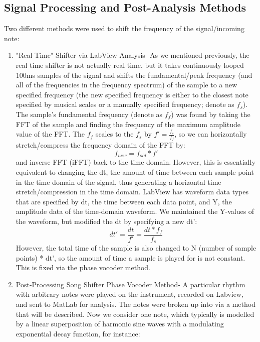 \documentclass{article}
\begin{document}
    \subsection{Signal Processing and Post-Analysis Methods}
        Two different methods were used to shift the frequency of the signal/incoming note:
        \begin{enumerate}
            \item "Real Time" Shifter via LabView Analysis- As we mentioned previously, the real time shifter is not actually real time, but it takes continuously looped 100ms samples of the signal and shifts the fundamental/peak frequency (and all of the frequencies in the frequency spectrum) of the sample to a new specified frequency (the new specified frequency is either to the closest note specified by musical scales or a manually specified frequency; denote as $f_s$). The sample's fundamental frequency (denote as $f_f$) was found by taking the FFT of the sample and finding the frequency of the maximum amplitude value of the FFT. The $f_f$ scales to the $f_s$ by $f'= \frac{f_s}{f_f}$, so we can horizontally stretch/compress the frequency domain of the FFT by:
            \begin{equation}
                f_{new} = f_{old} * f'
            \end{equation}
            and inverse FFT (iFFT) back to the time domain. However, this is essentially equivalent to changing the dt, the amount of time between each sample point in the time domain of the signal, thus generating a horizontal time stretch/compression in the time domain. LabView has waveform data types that are specified by dt, the time between each data point, and Y, the amplitude data of the time-domain waveform. We maintained the Y-values of the waveform, but modified the dt by specifying a new dt':
            \begin{equation}
                dt' = \frac{dt}{f'} = \frac{dt*f_f}{f_s}
            \end{equation}
            However, the total time of the sample is also changed to N (number of sample points) * dt', so the amount of time a sample is played for is not constant. This is fixed via the phase vocoder method.
            \item Post-Processing Song Shifter Phase Vocoder Method- A particular rhythm with arbitrary notes were played on the instrument, recorded on Labview, and sent to MatLab for analysis. The notes were broken up into via a method that will be described. Now we consider one note, which typically is modelled by a linear superposition of harmonic sine waves with a modulating exponential decay function, for instance:

\end{enumerate}
\end{document}
